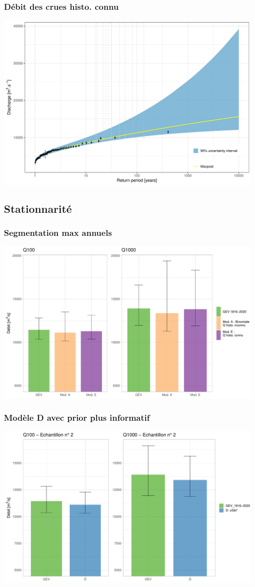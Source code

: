 \documentclass[compress,9pt]{beamer}
\begin{document}
    	\begin{frame}
    		\frametitle{Débit des crues histo. connu}
    		\centering
    		\includegraphics[width = .8\textwidth]{./Figures/Quantiles.pdf} 	
    	\end{frame}
    	
    	\subsection{Stationnarité}
    	
    	\begin{frame}
    		\frametitle{Segmentation max annuels}
    		\centering
    		\includegraphics[width = .7\textwidth]{./Figures/Barplots_QX_censure.pdf} 	
    	\end{frame}
    		
    	\begin{frame}
    		\frametitle{Modèle D avec prior plus informatif}
    		\centering
    		\includegraphics[width = .7\textwidth]{./Figures/Barplots_QX_C4short.pdf} 	
    	\end{frame}
    	
\end{document}
